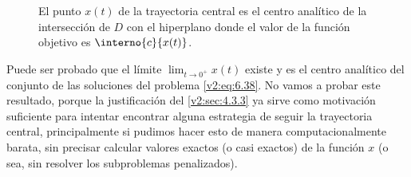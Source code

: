 \begin{figure}[htpb]
    \centering
    \caption{El punto $x(t)$ de la trayectoria central es el centro analítico de la intersección de $D$ con el hiperplano donde el valor de la función objetivo es $\interno{c}{x(t)}$.}
    \label{v2:fig:6.1.5}
\end{figure}

Puede ser probado que el límite $\lim_{t \to 0^+} x(t)$ existe y es el centro analítico del conjunto de las soluciones del problema \eqref{v2:eq:6.38}. No vamos a probar este resultado, porque la justificación del \cref{v2:sec:4.3.3} ya sirve como motivación suficiente para intentar encontrar alguna estrategia de seguir la trayectoria central, principalmente si pudimos hacer esto de manera computacionalmente barata, sin precisar calcular valores exactos (o casi exactos) de la función $x$ (o sea, sin resolver los subproblemas penalizados).


